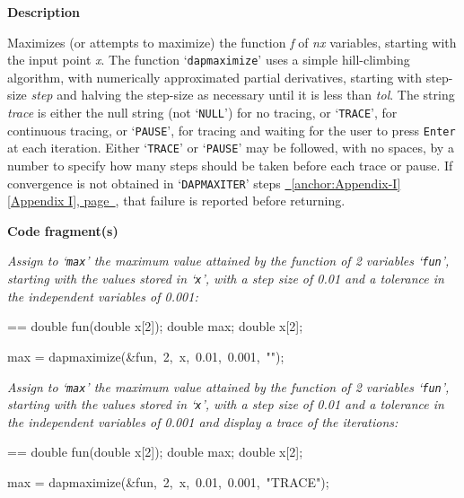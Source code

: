 \documentclass{book}
\makeatletter
\newcommand\Texinfocommandstyletextvar[1]{{\normalfont{}\textsl{#1}}}%
\newenvironment{Texinfopreformatted}{%
  \par\GNUTobeylines\obeyspaces\frenchspacing\parskip=\z@\parindent=\z@}{}
{\catcode`\^^M=13 \gdef\GNUTobeylines{\catcode`\^^M=13 \def^^M{\null\par}}}
\newenvironment{Texinfoindented}{\begin{list}{}{}\item\relax}{\end{list}}
\renewcommand{\_}{\Texinfounderscore\discretionary{}{}{}}
\makeatother
\begin{document}
\noindent{}\textbf{Description}

Maximizes (or attempts to maximize) the function \Texinfocommandstyletextvar{f}
of \Texinfocommandstyletextvar{nx} variables, starting with the input point \Texinfocommandstyletextvar{x}.
The function
`\texttt{dap\_maximize}' uses a simple hill-climbing algorithm, with
numerically approximated partial derivatives, starting with step-size
\Texinfocommandstyletextvar{step} and halving the step-size as necessary until it is less than
\Texinfocommandstyletextvar{tol}.
The string \Texinfocommandstyletextvar{trace} is either the null string (not `\texttt{NULL}') for no tracing,
or `\texttt{TRACE}', for continuous tracing, or
`\texttt{PAUSE}', for tracing and waiting for the user to press \texttt{Enter}
at each iteration.
Either `\texttt{TRACE}' or `\texttt{PAUSE}' may be followed, with no spaces, by a number
to specify how many steps should be taken before each trace or pause.
If convergence is not obtained in `\texttt{DAP\_MAXITER}'
steps \hyperref[anchor:Appendix-I]{\chaptername~\ref*{anchor:Appendix-I} [Appendix I], page~\pageref*{anchor:Appendix-I}}, that failure is
reported before returning.

\noindent{}\textbf{Code fragment(s)}

\emph{Assign to `\texttt{max}' the maximum value attained by the function
of 2 variables `\texttt{fun}', starting with the values stored in `\texttt{x}',
with a step size of 0.01 and a tolerance in the independent variables
of 0.001:}
\begin{Texinfoindented}
\begin{Texinfopreformatted}%
\ttfamily double fun(double x[2]);
double max;
double x[2];

max = dap\_maximize(\&fun,\ 2,\ x,\ 0.01,\ 0.001,\ "");
\end{Texinfopreformatted}
\end{Texinfoindented}

\emph{Assign to `\texttt{max}' the maximum value attained by the function
of 2 variables `\texttt{fun}', starting with the values stored in `\texttt{x}',
with a step size of 0.01 and a tolerance in the independent variables
of 0.001 and display a trace of the iterations:}
\begin{Texinfoindented}
\begin{Texinfopreformatted}%
\ttfamily double fun(double x[2]);
double max;
double x[2];

max = dap\_maximize(\&fun,\ 2,\ x,\ 0.01,\ 0.001,\ "TRACE");
\end{Texinfopreformatted}
\end{Texinfoindented}
\end{document}
